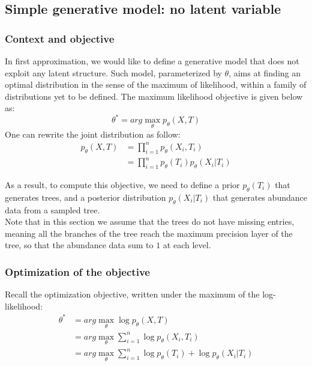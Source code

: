 \subsection{Simple generative model: no latent variable}

\subsubsection{Context and objective}

In first approximation, we would like to define a generative model that does not exploit any latent structure.
Such model, parameterized by $\theta$, aims at finding an optimal distribution in the sense of the maximum of likelihood,
within a family of distributions yet to be defined.
The maximum likelihood objective is given below as:
$$
\theta^* = arg\max_{\theta} p_{\theta}(X, T)
$$
One can rewrite the joint distribution as follow:
$$
\begin{align}
    p_{\theta}(X, T) &= \prod_{i=1}^n p_{\theta}(X_i, T_i) \\
                    &= \prod_{i=1}^n p_{\theta}(T_i) p_{\theta}(X_i | T_i)
\end{align}
$$

As a result, to compute this objective, we need to define a prior $p_{\theta}(T_i)$ that generates trees,
and a posterior distribution $p_{\theta}(X_i | T_i)$ that generates abundance data from a sampled tree. \\

Note that in this section we assume that the trees do not have missing entries, meaning all the branches of the tree
reach the maximum precision layer of the tree, so that the abundance data sum to $1$ at each level. \\





\subsubsection{Optimization of the objective}

Recall the optimization objective, written under the maximum of the log-likelihood:
$$
\begin{align}
    \theta^* &= arg \max_{\theta} \log p_{\theta}(X,T) \\
            &= arg \max_{\theta} \sum_{i=1}^n \log p_{\theta}(X_i, T_i) \\
            &= arg \max_{\theta} \sum_{i=1}^n \log p_{\theta}(T_i) + \log p_{\theta}(X_i | T_i)
\end{align}
$$

